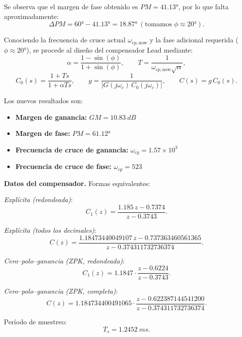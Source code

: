 Se observa que el margen de fase obtenido es $PM = \ang{41.13}$, por lo que falta aproximadamente:
\[
\Delta PM = \ang{60} - \ang{41.13} = \ang{18.87} \ (\text{tomamos } \phi \approx \ang{20}).
\]

Conociendo la frecuencia de cruce actual $\omega_{cp,\text{now}}$ y la fase adicional requerida ($\phi \approx \ang{20}$), se procede al diseño del compensador Lead mediante:
\[
\alpha = \frac{1 - \sin(\phi)}{1 + \sin(\phi)}, 
\qquad 
T = \frac{1}{\omega_{cp,\text{now}} \sqrt{\alpha}} ,
\]
\[
C_0(s) = \frac{1 + T s}{1 + \alpha T s}, 
\qquad 
g = \frac{1}{\left| G(j\omega_c) \, C_0(j\omega_c) \right|}, 
\qquad
C(s) = g \, C_0(s).
\]


Los nuevos resultados son:
\begin{itemize}
	\item \textbf{Margen de ganancia:} $GM = \SI{10.83}{dB}$
	\item \textbf{Margen de fase:} $PM = \ang{61.12}$
	\item \textbf{Frecuencia de cruce de ganancia:} $\omega_{cg} = 1.57 \times 10^3$
	\item \textbf{Frecuencia de cruce de fase:} $\omega_{cp} = 523$
\end{itemize}

\textbf{Datos del compensador.} Formas equivalentes:

\textit{Explícita (redondeada)}:
\[
C_1(z) = \frac{1.185\,z - 0.7374}{z - 0.3743}.
\]

\textit{Explícita (todos los decimales)}:
\[
C(z) = \frac{1.18473440049107\, z - 0.737363460561365}{z - 0.374311732736374}.
\]

\textit{Cero–polo–ganancia (ZPK, redondeada)}:
\[
C_1(z) = 1.1847 \cdot \frac{z - 0.6224}{z - 0.3743}.
\]

\textit{Cero–polo–ganancia (ZPK, completa)}:
\[
C(z) = 1.184734400491065 \cdot \frac{z - 0.622387144541200}{z - 0.374311732736374}.
\]

Período de muestreo: 
\[
T_s = \SI{1,2452}{ms}.
\]


